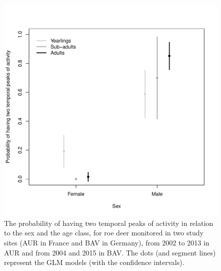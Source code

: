 \documentclass[a4paper,11pt]{article}
\begin{document}
\begin{figure} [!h]
  \centering
  \includegraphics[width=0.5\linewidth]{./figures/Fig4.pdf}
  \caption{The probability of having two temporal peaks of activity in
    relation to the sex and the age class, for roe deer monitored in
    two study sites (AUR in France and BAV in Germany), from 2002 to
    2013 in AUR and from 2004 and 2015 in BAV. The dots (and segment
    lines) represent the GLM models (with the confidence
    intervals).}\label{fig:probability}
\end{figure}
\end{document}
